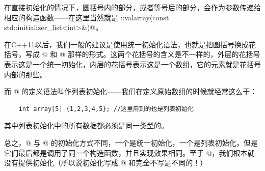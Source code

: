 在直接初始化的情况下，圆括号内的部分，或者等号后的部分，会作为参数传递给相应的构造函数——在这里当然就是 \lstinline@valarray::valarray(const std::initializer_list<int>&)@。\par
在C++11以后，我们一般的建议是使用统一初始化语法，也就是把圆括号换成花括号，写成 @ 和 @ 那样的形式。这两个花括号的含义是不一样的，外层的花括号表示这是一个统一初始化，内层的花括号表示这是一个数组，它的元素就是花括号内部的那些。\par
而 @ 的定义语法叫作列表初始化——我们在定义原始数组的时候就经常这么干：
\begin{lstlisting}
    int array[5] {1,2,3,4,5}; //这里用到的也是列表初始化
\end{lstlisting}
其中列表初始化中的所有数据都必须是同一类型的。\par
总之，@ 与 @ 的初始化方式不同，一个是统一初始化，一个是列表初始化，但是它们最后都是调用了同一个构造函数，并且实现效果相同。至于 @，我们根本就没有提供初始化（所以说初始化写成 \lstinline@{}@ 和完全不写是不同的！）
